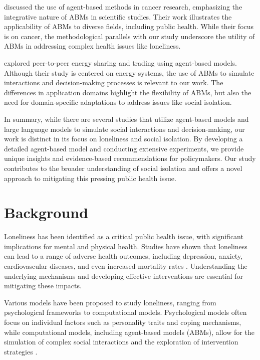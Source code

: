 \documentclass{article} %
\begin{document}
\citet{west2023agent} discussed the use of agent-based methods in cancer research, emphasizing the integrative nature of ABMs in scientific studies. Their work illustrates the applicability of ABMs to diverse fields, including public health. While their focus is on cancer, the methodological parallels with our study underscore the utility of ABMs in addressing complex health issues like loneliness.

\citet{zhou2023peer} explored peer-to-peer energy sharing and trading using agent-based models. Although their study is centered on energy systems, the use of ABMs to simulate interactions and decision-making processes is relevant to our work. The differences in application domains highlight the flexibility of ABMs, but also the need for domain-specific adaptations to address issues like social isolation.

In summary, while there are several studies that utilize agent-based models and large language models to simulate social interactions and decision-making, our work is distinct in its focus on loneliness and social isolation. By developing a detailed agent-based model and conducting extensive experiments, we provide unique insights and evidence-based recommendations for policymakers. Our study contributes to the broader understanding of social isolation and offers a novel approach to mitigating this pressing public health issue.

\section{Background}
\label{sec:background}

Loneliness has been identified as a critical public health issue, with significant implications for mental and physical health. Studies have shown that loneliness can lead to a range of adverse health outcomes, including depression, anxiety, cardiovascular diseases, and even increased mortality rates \citep{park2023generative, shanahan2023role}. Understanding the underlying mechanisms and developing effective interventions are essential for mitigating these impacts.

Various models have been proposed to study loneliness, ranging from psychological frameworks to computational models. Psychological models often focus on individual factors such as personality traits and coping mechanisms, while computational models, including agent-based models (ABMs), allow for the simulation of complex social interactions and the exploration of intervention strategies \citep{wang2023describe, liu2023agentbench}.
\end{document}

